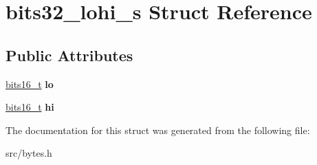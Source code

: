 \hypertarget{structbits32__lohi__s}{}\section{bits32\+\_\+lohi\+\_\+s Struct Reference}
\label{structbits32__lohi__s}
\subsection*{Public Attributes}
\begin{DoxyCompactItemize}
\item 
\hyperlink{unionbits16__s}{bits16\+\_\+t} {\bfseries lo}\hypertarget{structbits32__lohi__s_a2bb6689fada2f0b307c3598ae2240cda}{}\label{structbits32__lohi__s_a2bb6689fada2f0b307c3598ae2240cda}

\item 
\hyperlink{unionbits16__s}{bits16\+\_\+t} {\bfseries hi}\hypertarget{structbits32__lohi__s_a6c46dfbcf186ea55f520cd63aa043e32}{}\label{structbits32__lohi__s_a6c46dfbcf186ea55f520cd63aa043e32}

\end{DoxyCompactItemize}


The documentation for this struct was generated from the following file\+:\begin{DoxyCompactItemize}
\item 
src/bytes.\+h\end{DoxyCompactItemize}
